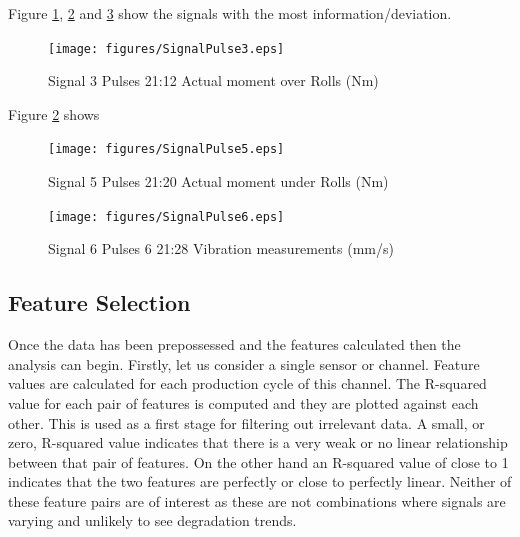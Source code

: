 \documentclass{article}
\begin{document}
Figure \ref{fig:SignalPulse3}, \ref{fig:SignalPulse5} and \ref{fig:SignalPulse6} show the signals with the most information/deviation.

 
\begin{figure}[H]
    \centering
    \texttt{[image: figures/SignalPulse3.eps]}
    \caption{Signal 3 Pulses 21:12 Actual moment over Rolls (Nm)}
    \label{fig:SignalPulse3}
\end{figure}


Figure \ref{fig:SignalPulse5} shows 
\begin{figure}[H]
    \centering
    \texttt{[image: figures/SignalPulse5.eps]}
    \caption{Signal 5 Pulses 21:20 Actual moment under Rolls (Nm)}
    \label{fig:SignalPulse5}
\end{figure}


\begin{figure}[H]
    \centering
    \texttt{[image: figures/SignalPulse6.eps]}
    \caption{Signal 6 Pulses 6 21:28 Vibration measurements (mm/s)}
    \label{fig:SignalPulse6}
\end{figure}

 

\subsection{Feature Selection}
Once the data has been prepossessed and the features calculated then the analysis can begin. Firstly, let us consider a single sensor or channel. Feature values are calculated for each production cycle of this channel. The R-squared value for each pair of features is computed and they are plotted against each other. This is used as a first stage for filtering out irrelevant data. A small, or zero, R-squared value indicates that there is a very weak or no linear relationship between that pair of features. On the other hand an R-squared value of close to 1 indicates that the two features are perfectly or close to perfectly linear. Neither of these feature pairs are of interest as these are not combinations where signals are varying and unlikely to see degradation trends. 
\end{document}
